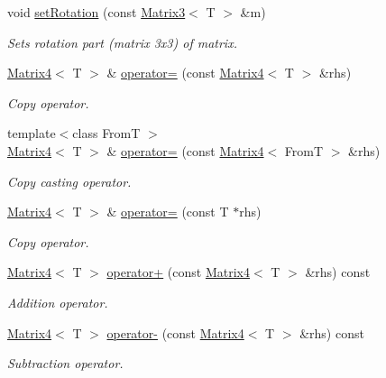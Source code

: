 \begin{DoxyCompactItemize}
\item 
void \hyperlink{class_matrix4_a1364b4ea9ddb21af98db5256f82a0515}{setRotation} (const \hyperlink{class_matrix3}{Matrix3}$<$ T $>$ \&m)
\begin{DoxyCompactList}\small\item\em Sets rotation part (matrix 3x3) of matrix. \item\end{DoxyCompactList}\item 
\hyperlink{class_matrix4}{Matrix4}$<$ T $>$ \& \hyperlink{class_matrix4_abaab668421b08bb7588f5e41a508099c}{operator=} (const \hyperlink{class_matrix4}{Matrix4}$<$ T $>$ \&rhs)
\begin{DoxyCompactList}\small\item\em Copy operator. \item\end{DoxyCompactList}\item 
{\footnotesize template$<$class FromT $>$ }\\\hyperlink{class_matrix4}{Matrix4}$<$ T $>$ \& \hyperlink{class_matrix4_a7100801643261624c02ce196185a3436}{operator=} (const \hyperlink{class_matrix4}{Matrix4}$<$ FromT $>$ \&rhs)
\begin{DoxyCompactList}\small\item\em Copy casting operator. \item\end{DoxyCompactList}\item 
\hyperlink{class_matrix4}{Matrix4}$<$ T $>$ \& \hyperlink{class_matrix4_a180ee55d24b911aa98b6d30f4824ddec}{operator=} (const T $\ast$rhs)
\begin{DoxyCompactList}\small\item\em Copy operator. \item\end{DoxyCompactList}\item 
\hyperlink{class_matrix4}{Matrix4}$<$ T $>$ \hyperlink{class_matrix4_a114856c2bd8e47908c40cbd6d18533f1}{operator+} (const \hyperlink{class_matrix4}{Matrix4}$<$ T $>$ \&rhs) const 
\begin{DoxyCompactList}\small\item\em Addition operator. \item\end{DoxyCompactList}\item 
\hyperlink{class_matrix4}{Matrix4}$<$ T $>$ \hyperlink{class_matrix4_a385f1a4401e78842e8061fe350f74540}{operator-\/} (const \hyperlink{class_matrix4}{Matrix4}$<$ T $>$ \&rhs) const 
\begin{DoxyCompactList}\small\item\em Subtraction operator. \item\end{DoxyCompactList}\item 

\end{DoxyCompactItemize}
